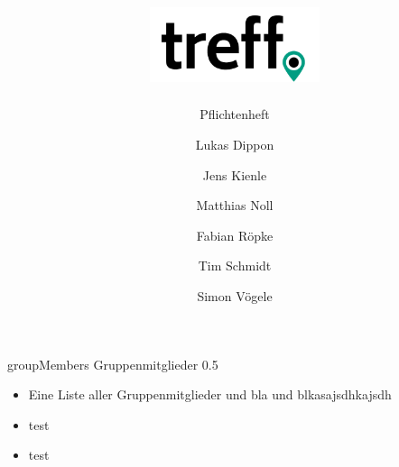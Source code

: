 \documentclass[aspectratio=1610]{beamer}
\title{\includegraphics[width = 50mm]{images/logo_crop.png}}
\subtitle{\huge Pflichtenheft}
\author{Lukas Dippon
	\and Jens Kienle
	\and Matthias Noll
	\and Fabian Röpke
	\and Tim Schmidt
	\and Simon Vögele}
\begin{document}
	
	\begin{frame}[plain]
	\maketitle
	\end{frame}

	\begin{frame}[plain]
	{groupMembers}
	{Gruppenmitglieder}
	{0.5}%
	\begin{minipage}{0.5\textwidth}
		\begin{itemize}
			\item Eine Liste aller Gruppenmitglieder und bla und blkasajsdhkajsdh
			\item test
			\item test
		\end{itemize}
	\end{minipage}
	
	\end{frame}
\end{document}
